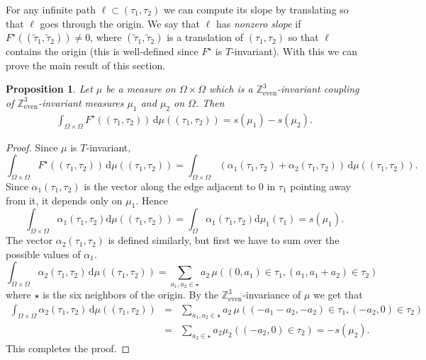 \documentclass[11pt]{article}
\newtheorem{prop}[thm]{Proposition}
\theoremstyle{remark}
\theoremstyle{definition}
\newcommand{\Z}{\mathbb{Z}}
\newcommand{\threeeven}{\Z^3_{\text{even}}}
\newcommand{\dd}{\mathrm{d}}
\begin{document}
For any infinite path $\ell \subset (\tau_1,\tau_2)$ we can compute its slope by translating so that $\ell$ goes through the origin. We say that $\ell$ has \textit{nonzero slope} if $F^\star((\widetilde\tau_1,\widetilde\tau_2))\neq 0$, where $(\widetilde\tau_1,\widetilde\tau_2)$ is a translation of $(\tau_1,\tau_2)$ so that $\ell$ contains the origin (this is well-defined since $F^\star$ is $T$-invariant). With this we can prove the main result of this section. 

\begin{prop}\label{prop: line slope integrates to mean current difference}
Let $\mu$ be a measure on $\Omega\times \Omega$ which is a $\threeeven$-invariant coupling of $\threeeven$-invariant measures $\mu_1$ and $\mu_2$ on $\Omega$. Then  
 \begin{align*}
     \int_{\Omega\times \Omega} F^{\star}((\tau_1, \tau_2))\,\dd\mu((\tau_1, \tau_2))= s(\mu_1)-s(\mu_2).
 \end{align*}
\end{prop}
\begin{proof} 
Since $\mu$ is $T$-invariant, 
$$\int_{\Omega \times\Omega}F^{\star}((\tau_1, \tau_2))\,\dd\mu((\tau_1, \tau_2))= \int_{\Omega\times\Omega}(\alpha_1(\tau_1, \tau_2)+\alpha_2(\tau_1, \tau_2))\,\dd\mu((\tau_1, \tau_2)).$$
Since $\alpha_1(\tau_1, \tau_2)$ is the vector along the edge adjacent to $0$ in $\tau_1$ pointing away from it, it depends only on $\mu_1$. Hence
$$\int_{\Omega\times\Omega}\alpha_1(\tau_1, \tau_2) \dd\mu((\tau_1, \tau_2))= \int_{\Omega}\alpha_1(\tau_1, \tau_2) \dd\mu_1(\tau_1)=s(\mu_1).$$
The vector $\alpha_2(\tau_1,\tau_2)$ is defined similarly, but first we have to sum over the possible values of $\alpha_1$. 
$$\int_{\Omega\times\Omega}\alpha_2(\tau_1, \tau_2) \,\dd\mu ((\tau_1, \tau_2))= \sum_{a_1,a_2\in \star}a_2 \,\mu((0,a_1)\in \tau_1,(a_1,a_1+a_2)\in \tau_2)$$
where $\star$ is the six neighbors of the origin. By the $\threeeven$-invariance of $\mu$ we get that
\begin{eqnarray*}
	\int_{\Omega\times\Omega}\alpha_2(\tau_1, \tau_2) \,\dd\mu((\tau_1, \tau_2))&=& \sum_{a_1,a_2\in \star} a_2\,\mu((-a_1-a_2,-a_2)\in \tau_1, (-a_2,0)\in \tau_2)\\
	&=&\sum_{a_2\in \star}a_2 \mu_2((-a_2, 0)\in \tau_2)=-s(\mu_2).
	\end{eqnarray*}
This completes the proof.
	\end{proof}
 
\end{document}
